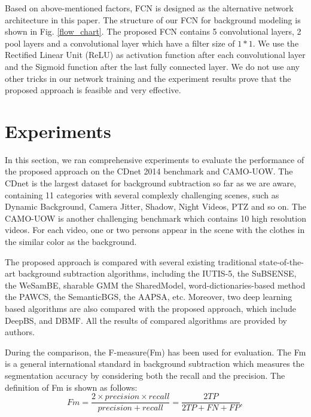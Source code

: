 \documentclass[journal]{IEEEtran}
\newcommand{\reffig}[1]{Fig. \ref{#1}}
\begin{document}
Based on above-mentioned factors, FCN is designed as the alternative network architecture in this paper. 
The structure of our FCN for background modeling is shown in \reffig{flow_chart}. 
The proposed FCN contains 5 convolutional layers, 2 pool layers and a convolutional layer which have a filter size of $1*1$. 
We use the Rectified Linear Unit (ReLU) as activation function after each convolutional layer and the Sigmoid function after the last fully connected layer. 
We do not use any other tricks in our network training and the experiment results prove that the proposed approach is feasible and very effective.


\section{Experiments}
\label{sec5}
In this section, we ran comprehensive experiments to evaluate the performance of the proposed approach on the CDnet 2014 benchmark\cite{CDN2014} and CAMO-UOW. 
The CDnet is the largest dataset for background subtraction so far as we are aware, containing 11 categories with several complexly challenging scenes, such as Dynamic Background, Camera Jitter, Shadow, Night Videos, PTZ and so on. 
The CAMO-UOW is another challenging benchmark which contains 10 high resolution videos. 
For each video, one or two persons appear in the scene with the clothes in the similar color as the background.

The proposed approach is compared with several existing traditional state-of-the-art background subtraction algorithms, including the IUTIS-5\cite{Bianco2017TEC}, the SuBSENSE\cite{St-Charles2015SuBSENSE}, the WeSamBE\cite{Jiang2017WeSamBE}, sharable GMM the SharedModel\cite{Chen2015SharedModel}, word-dictionaries-based method the PAWCS\cite{Charles2015PAWCS}, the SemanticBGS\cite{Braham2017Semantic}, the AAPSA\cite{RAMIREZALONSO2016990}, etc. 
Moreover, two deep learning based algorithms are also compared with the proposed approach, which include DeepBS\cite{Babaee2017deep}, and DBMF\cite{Yang2018DBMF}. 
All the results of compared algorithms are provided by authors.

During the comparison, the F-measure(Fm) has been used for evaluation. 
The Fm is a general international standard in background subtraction which measures the segmentation accuracy by considering both the recall and the precision. 
The definition of Fm is shown as follows:
\begin{equation}
Fm= \frac{2\times precision \times recall}{precision + recall} = \frac{2TP}{2TP+FN+FP},
\end{equation}
% 
% 
%
\end{document}
